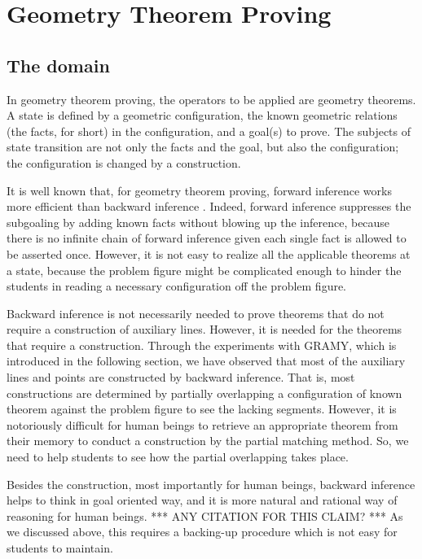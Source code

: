 
\section{Geometry Theorem Proving}

\subsection{The domain}

In geometry theorem proving, the operators to be applied are geometry
theorems.  A state is defined by a geometric configuration, the known
geometric relations (the facts, for short) in the configuration, and a
goal(s) to prove.  The subjects of state transition are not only the
facts and the goal, but also the configuration; the configuration is
changed by a construction.

It is well known that, for geometry theorem proving, forward inference
works more efficient than backward inference \cite{Nevins75}.  Indeed,
forward inference suppresses the subgoaling by adding known facts
without blowing up the inference, because there is no infinite chain of
forward inference given each single fact is allowed to be asserted once.
However, it is not easy to realize all the applicable theorems at a
state, because the problem figure might be complicated enough to hinder
the students in reading a necessary configuration off the problem
figure.

Backward inference is not necessarily needed to prove theorems that do
not require a construction of auxiliary lines.  However, it is needed
for the theorems that require a construction.  Through the experiments
with GRAMY, which is introduced in the following section, we have
observed that most of the auxiliary lines and points are constructed by
backward inference.  That is, most constructions are determined by
partially overlapping a configuration of known theorem against the
problem figure to see the lacking segments.  However, it is notoriously
difficult for human beings to retrieve an appropriate theorem from their
memory to conduct a construction by the partial matching method.  So, we
need to help students to see how the partial overlapping takes place.  

Besides the construction, most importantly for human beings, backward
inference helps to think in goal oriented way, and it is more natural
and rational way of reasoning for human beings.  *** ANY CITATION FOR
THIS CLAIM?  *** As we discussed above, this requires a backing-up
procedure which is not easy for students to maintain.  

